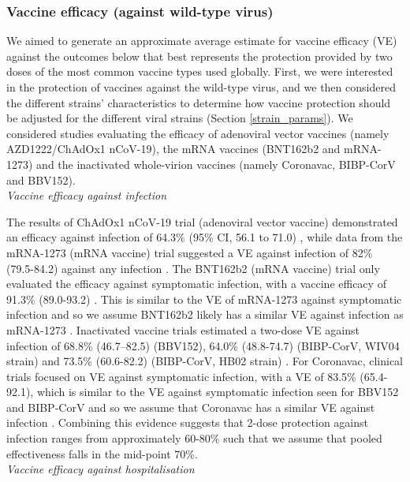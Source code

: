\subsubsection{Vaccine efficacy (against wild-type virus)}
\label{vacc_params}
We aimed to generate an approximate average estimate for vaccine efficacy (VE) against the outcomes below that best represents 
the protection provided by two doses of the most common vaccine types used globally. First, we were interested in the protection 
of vaccines against the wild-type virus, and we then considered the different strains' characteristics
to determine how vaccine protection should be adjusted for the different viral strains (Section \ref{strain_params}). 
We considered studies evaluating the efficacy of adenoviral vector vaccines (namely AZD1222/ChAdOx1 nCoV-19), the mRNA vaccines (BNT162b2 and mRNA-1273) and the 
inactivated whole-virion vaccines (namely Coronavac, BIBP-CorV and BBV152).\\

\textit{Vaccine efficacy against infection}

The results of ChAdOx1 nCoV-19 trial (adenoviral vector vaccine) demonstrated an efficacy against infection of 
64.3\% (95\% CI, 56.1 to 71.0) \cite{falsey2021}, while data from the mRNA-1273 (mRNA vaccine) trial suggested a VE against infection 
of 82\% (79.5-84.2) against any infection \cite{elsahly2021}. The BNT162b2 (mRNA vaccine) trial only evaluated the efficacy 
against symptomatic infection, with a vaccine efficacy of 91.3\% (89.0-93.2) \cite{thomas2021}. This is similar to the VE of 
mRNA-1273 against symptomatic infection and so we assume BNT162b2 likely has a similar VE against infection as mRNA-1273 \cite{elsahly2021, thomas2021}.
Inactivated vaccine trials estimated a two-dose VE against infection of 68.8\% (46.7–82.5) (BBV152), 64.0\% (48.8-74.7) (BIBP-CorV, WIV04 strain) 
and 73.5\% (60.6-82.2) (BIBP-CorV, HB02 strain) \cite{ella2021, alkaabi2021}. For Coronavac, clinical trials focused on VE against 
symptomatic infection, with a VE of 83.5\% (65.4-92.1), which is similar to the VE against symptomatic infection seen for BBV152 and BIBP-CorV and 
so we assume that Coronavac has a similar VE against infection \cite{tanriover2021, ella2021, alkaabi2021}.
Combining this evidence suggests that 2-dose protection against infection ranges from approximately 60-80\% such that we assume that pooled effectiveness falls in the mid-point 70\%.\\

\textit{Vaccine efficacy against hospitalisation}

